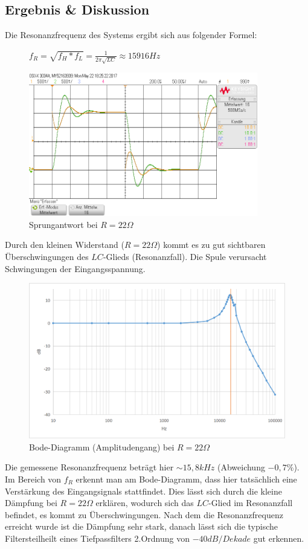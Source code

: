 \documentclass[12pt,a4paper,titlepage]{article}
\begin{document}
\subsection{Ergebnis \& Diskussion}
Die Resonanzfrequenz des Systems ergibt sich aus folgender Formel:
\begin{figure}[H]
  \centering
  $f_R = \sqrt{f_H*f_L} = \frac{1}{2\pi\sqrt{LC}} \approx 15916Hz$
\end{figure}

\begin{figure}[H]
  \centering
  \includegraphics[width=100mm]{sprungantwort_rlc_22.png}
  \caption{Sprungantwort bei $R=22\Omega$}
\end{figure}
\noindent Durch den kleinen Widerstand ($R=22\Omega$) kommt es zu gut sichtbaren \"Uberschwingungen des $LC$-Glieds (Resonanzfall). Die Spule verursacht Schwingungen der Eingangsspannung.

\begin{figure}[H]
  \centering
  \includegraphics[width=150mm]{bode_rlc_22.png}
  \caption{Bode-Diagramm (Amplitudengang) bei $R=22\Omega$}
\end{figure}
\noindent Die gemessene Resonanzfrequenz betr\"agt hier $\sim15,8kHz$ (Abweichung $-0,7\%$). Im Bereich von $f_R$ erkennt man am Bode-Diagramm, dass hier tats\"achlich eine Verstärkung des Eingangsignals stattfindet. Dies lässt sich durch die kleine Dämpfung bei $R=22\Omega$ erkl\"aren, wodurch sich das $LC$-Glied im Resonanzfall befindet, es kommt zu \"Uberschwingungen. Nach dem die Resonanzfrequenz erreicht wurde ist die D\"ampfung sehr stark, danach l\"asst sich die typische Filtersteilheilt eines Tiefpassfilters 2.Ordnung von $-40dB/Dekade$ gut erkennen.\\
\end{document}
